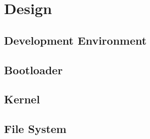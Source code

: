 \section{Design}
\subsection{Development Environment}
\subsection{Bootloader}
\subsection{Kernel}
\subsection{File System}
